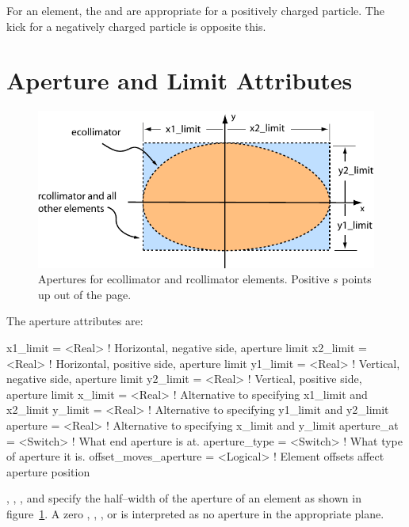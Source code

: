 For an  element, the  and  are
appropriate for a positively charged particle. The kick for a
negatively charged particle is opposite this.

\section{Aperture and Limit Attributes}
\label{s:limit}

\begin{figure}[ht]
  \centering
  \includegraphics{apertures.pdf}
  \caption[Apertures for ecollimator and rcollimator elements.]
  {Apertures for ecollimator and rcollimator elements. 
  Positive $s$ points up out of the page.}
  \label{f:limit}
\end{figure}

The aperture attributes are:
\begin{example}
  x1_limit      = <Real>      ! Horizontal, negative side, aperture limit
  x2_limit      = <Real>      ! Horizontal, positive side, aperture limit
  y1_limit      = <Real>      ! Vertical, negative side, aperture limit
  y2_limit      = <Real>      ! Vertical, positive side, aperture limit
  x_limit       = <Real>      ! Alternative to specifying x1_limit and x2_limit
  y_limit       = <Real>      ! Alternative to specifying y1_limit and y2_limit
  aperture      = <Real>      ! Alternative to specifying x_limit and y_limit
  aperture_at   = <Switch>    ! What end aperture is at.
  aperture_type = <Switch>    ! What type of aperture it is.
  offset_moves_aperture = <Logical> ! Element offsets affect aperture position
\end{example}
, , , and  specify
the half--width of the aperture of an element as shown in
figure~\ref{f:limit}. A zero , ,
, or  is interpreted as no aperture in the
appropriate plane.

